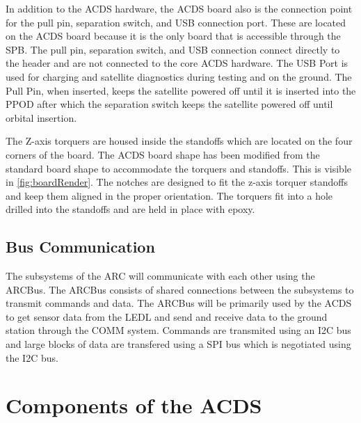 In addition to the \ac{ACDS} hardware, the \ac{ACDS} board also is the connection point for the pull pin, separation switch, and \ac{USB} connection port. These are located on the \ac{ACDS} board because it is the only board that is accessible through the \ac{SPB}. The pull pin, separation switch, and \ac{USB} connection connect directly to the header and are not connected to the core \ac{ACDS} hardware. The \ac{USB} Port is used for charging and satellite diagnostics during testing and on the ground. The Pull Pin, when inserted, keeps the satellite powered off until it is inserted into the \ac{PPOD} after which the separation switch keeps the satellite powered off until orbital insertion.

The Z-axis torquers are housed inside the standoffs which are located on the four corners of the board. The \ac{ACDS} board shape has been modified from the standard board shape to accommodate the torquers and standoffs. This is visible in \cref{fig:boardRender}. The notches are designed to fit the z-axis torquer standoffs and keep them aligned in the proper orientation. The torquers fit into a hole drilled into the standoffs and are held in place with epoxy. 

\subsection{Bus Communication}

The subsystems of the \ac{ARC} will communicate with each other using the ARCBus. The ARCBus consists of shared connections between the subsystems to transmit commands and data. The ARCBus will be primarily used by the \ac{ACDS} to get sensor data from the \ac{LEDL} and send and receive data to the ground station through the COMM system. Commands are transmited using an \ac{I2C} bus and large blocks of data are transfered using a \ac{SPI} bus which is negotiated using the \ac{I2C} bus.

\section{Components of the \acl*{ACDS}}


